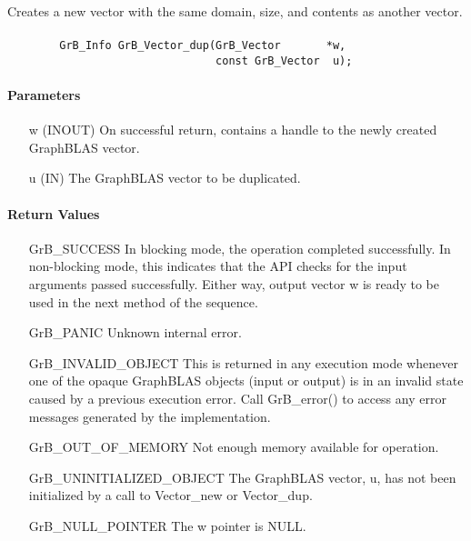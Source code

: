 Creates a new vector with the same domain, size, and contents as another vector.

\paragraph{\syntax}

\begin{verbatim}
        GrB_Info GrB_Vector_dup(GrB_Vector       *w,
                                const GrB_Vector  u);
\end{verbatim}

\paragraph{Parameters}

\begin{itemize}[leftmargin=1.1in]
    \item[{\sf w}]  ({\sf INOUT}) On successful return, contains a handle
                                  to the newly created GraphBLAS vector.
    \item[{\sf u}]  ({\sf IN})    The GraphBLAS vector to be duplicated.
\end{itemize}

\paragraph{Return Values}

\begin{itemize}[leftmargin=2.1in]
    \item[{\sf GrB\_SUCCESS}]         In blocking mode, the operation completed
    successfully. In non-blocking mode, this indicates that the API checks 
    for the input arguments passed successfully. Either way, output vector 
    {\sf w} is ready to be used in the next method of the sequence.

    \item[{\sf GrB\_PANIC}]           Unknown internal error.
    
    \item[{\sf GrB\_INVALID\_OBJECT}] This is returned in any execution mode 
    whenever one of the opaque GraphBLAS objects (input or output) is in an invalid 
    state caused by a previous execution error.  Call {\sf GrB\_error()} to access 
    any error messages generated by the implementation.

    \item[{\sf GrB\_OUT\_OF\_MEMORY}] Not enough memory available for operation.
    
    \item[{\sf GrB\_UNINITIALIZED\_OBJECT}]  The GraphBLAS vector, {\sf u}, has 
    not been initialized by a call to {\sf Vector\_new} or {\sf Vector\_dup}.
    
    \item[{\sf GrB\_NULL\_POINTER}]  The {\sf w} pointer is {\sf NULL}.
\end{itemize}


